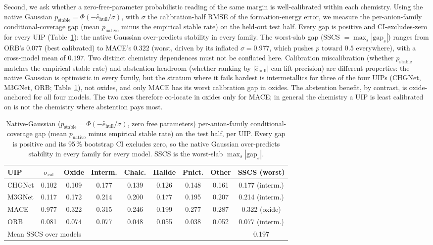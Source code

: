 \documentclass[aip,jcp,preprint,superscriptaddress,amsmath,amssymb]{revtex4-2}
\begin{document}
Second, we ask whether a zero-free-parameter probabilistic reading of the same margin is
well-calibrated within each chemistry. Using the native Gaussian
$p_{\mathrm{stable}} = \Phi(-\hat{e}_{\mathrm{hull}}/\sigma)$, with $\sigma$ the
calibration-half RMSE of the formation-energy error, we measure the per-anion-family
conditional-coverage gap (mean $p_{\mathrm{native}}$ minus the empirical stable rate) on the
held-out test half. Every gap is positive and CI-excludes-zero for every UIP
(Table~\ref{tab:sscs}): the native Gaussian over-predicts stability in every family. The
worst-slab gap (SSCS $= \max_s |\mathrm{gap}_s|$) ranges from ORB's $0.077$ (best calibrated)
to MACE's $0.322$ (worst, driven by its inflated $\sigma = 0.977$, which pushes $p$ toward
$0.5$ everywhere), with a cross-model mean of $0.197$. Two distinct chemistry dependences must
not be conflated here. Calibration miscalibration (whether $p_{\mathrm{stable}}$ matches the
empirical stable rate) and abstention headroom (whether ranking by $|\hat{e}_{\mathrm{hull}}|$
can lift precision) are different properties: the native Gaussian is optimistic in every family,
but the stratum where it fails hardest is intermetallics for three of the four
UIPs (CHGNet, M3GNet, ORB; Table~\ref{tab:sscs}), not oxides, and only MACE has its worst
calibration gap in oxides. The abstention benefit, by contrast, is oxide-anchored for all four
models. The two axes therefore co-locate in oxides only for MACE; in general the chemistry a
UIP is least calibrated on is not the chemistry where abstention pays most.

\begin{table}[t]
  \centering
  \caption{Native-Gaussian ($p_{\mathrm{stable}} = \Phi(-\hat{e}_{\mathrm{hull}}/\sigma)$,
  zero free parameters) per-anion-family conditional-coverage gap (mean $p_{\mathrm{native}}$
  minus empirical stable rate) on the test half, per UIP. Every gap is positive and its
  95\,\% bootstrap CI excludes zero, so the native Gaussian over-predicts stability in every
  family for every model. SSCS is the worst-slab $\max_s |\mathrm{gap}_s|$.}
  \label{tab:sscs}
  \begin{tabular}{lcccccccc}
    \toprule
    UIP & $\sigma_{\mathrm{cal}}$ & Oxide & Interm. & Chalc. & Halide & Pnict. & Other & SSCS (worst) \\
    \midrule
    CHGNet & 0.102 & 0.109 & 0.177 & 0.139 & 0.126 & 0.148 & 0.161 & 0.177 (interm.) \\
    M3GNet & 0.117 & 0.172 & 0.214 & 0.200 & 0.177 & 0.195 & 0.207 & 0.214 (interm.) \\
    MACE   & 0.977 & 0.322 & 0.315 & 0.246 & 0.199 & 0.277 & 0.287 & 0.322 (oxide) \\
    ORB    & 0.081 & 0.074 & 0.077 & 0.048 & 0.055 & 0.038 & 0.052 & 0.077 (interm.) \\
    \midrule
    \multicolumn{8}{l}{Mean SSCS over models} & 0.197 \\
    \bottomrule
  \end{tabular}
\end{table}
\end{document}

